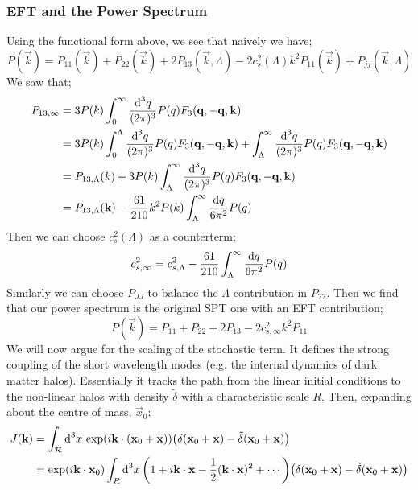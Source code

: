 \subsubsection{EFT and the Power Spectrum}
Using the functional form above, we see that naively we have;
\begin{equation*}
P(\vec{k}) = P_{11}(\vec{k}) + P_{22}(\vec{k}) + 2P_{13}(\vec{k}, \Lambda) - 2c_s^2(\Lambda) k^2 P_{11}(\vec{k}) + P_{jj}(\vec{k}, \Lambda)
\end{equation*}
We saw that;
\begin{align*}
P_{13, \infty} &= 3P(k)\int_0^{\infty}{\frac{\text{d}^3 q}{(2\pi)^3}P(q)F_3(\mathbf{q}, -\mathbf{q}, \mathbf{k})} \\
&= 3P(k)\int_0^{\Lambda}{\frac{\text{d}^3 q}{(2\pi)^3}P(q)F_3(\mathbf{q}, -\mathbf{q}, \mathbf{k})} + \int_\Lambda^{\infty}{\frac{\text{d}^3 q}{(2\pi)^3}P(q)F_3(\mathbf{q}, -\mathbf{q}, \mathbf{k})} \\
&= P_{13,\Lambda}(k) + 3P(k)\int_\Lambda^{\infty}{\frac{\text{d}^3 q}{(2\pi)^3}P(q)F_3(\mathbf{q}, -\mathbf{q}, \mathbf{k})} \\
&= P_{13,\Lambda}(\mathbf{k}) - \frac{61}{210}k^2 P(k)\int_\Lambda^{\infty}{\frac{\text{d} q}{6\pi^2}P(q)}
\end{align*}
Then we can choose $c_s^2(\Lambda)$ as a counterterm;
\begin{equation}
c_{s,\infty}^2 = c_{s, \Lambda}^2 - \frac{61}{210}\int_\Lambda^{\infty}{\frac{\text{d} q}{6\pi^2}P(q)}
\end{equation}
Similarly we can choose $P_{JJ}$ to balance the $\Lambda$ contribution in $P_{22}$. Then we find that our power spectrum is the original SPT one with an EFT contribution;
\begin{equation}
P(\vec{k}) = P_{11} + P_{22} + 2P_{13} - 2c_{s, \infty}^2 k^2 P_{11}
\end{equation}
We will now argue for the scaling of the stochastic term. It defines the strong coupling of the short wavelength modes (e.g. the internal dynamics of dark matter halos). Essentially it tracks the path from the linear initial conditions to the non-linear halos with density $\tilde{\delta}$ with a characteristic scale $R$. Then, expanding about the centre of mass, $\vec{x}_0$;
\begin{align*}
J(\vec{k}) &= \int_{\mathcal{R}}{\upd{^3 x}\exp\left(i\vec{k}\cdot (\vec{x}_0 + \vec{x})\right)\left(\delta\left(\vec{x}_0 + \vec{x}\right) - \tilde{\delta}(\vec{x}_0 + \vec{x})\right)} \\
&= \exp\left(i\vec{k} \cdot\vec{x}_0\right) \int_R{\upd{^3 x}\left(1 + i\vec{k}\cdot\vec{x} - \frac{1}{2}(\vec{k}\cdot\vec{x})^2 + \cdots\right)\left(\delta(\vec{x}_0 + \vec{x}) - \tilde{\delta}(\vec{x}_0 + \vec{x})\right)}
\end{align*}
